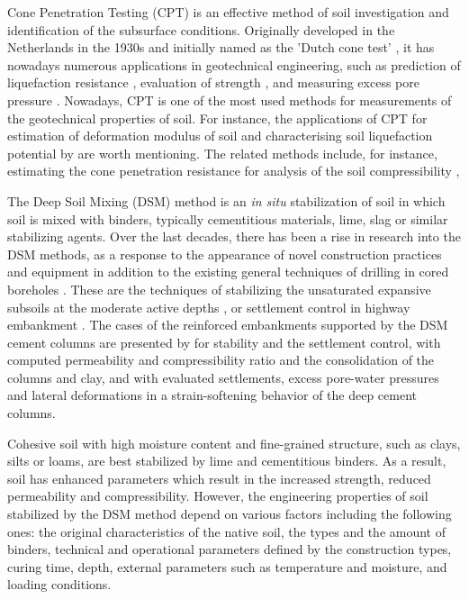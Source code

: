 \documentclass[final,3p,times,onecolumn,authoryear]{elsarticle}
\begin{document}
Cone Penetration Testing (CPT) is an effective method of soil investigation and identification of the subsurface conditions. Originally developed in the Netherlands in the 1930s and initially named as the 'Dutch cone test' \citep{brouwer2007situ,mccallum_2014}, it has nowadays numerous applications in geotechnical engineering, such as prediction of liquefaction resistance \citep{Olsen,Fitzgerald,Saye}, evaluation of strength \citep{Priceetal2016,Jamiolkowski}, and measuring excess pore pressure \citep{SullyCampanella,Elsworthetal2006}. Nowadays, CPT is one of the most used methods for measurements of the geotechnical properties of soil. For instance, the applications of CPT for estimation of deformation modulus of soil \citep{SHAHIEN2013633,BENZNAVARRETE2022289} and characterising soil liquefaction potential by \cite{GUAN20221221} are worth mentioning. The related methods include, for instance, estimating the cone penetration resistance for analysis of the soil compressibility \citep{Bishtetal2021}, 

The Deep Soil Mixing (DSM) method is an \emph{in situ} stabilization of soil in which soil is mixed with binders, typically cementitious materials, lime, slag or similar stabilizing agents. Over the last decades, there has been a rise in research into the DSM methods, as a response to the appearance of novel construction practices and equipment in addition to the existing general techniques of drilling in cored boreholes \citep{Hepton}. These are the techniques of stabilizing the unsaturated expansive subsoils at the moderate active depths \citep{MadhyannapuPuppala,Madhyannapu}, or settlement control in highway embankment \citep{Archeewa}. The cases of the reinforced embankments supported by the DSM cement columns are presented by \cite{Lambrechts} for stability and the settlement control, \cite{Bergado}
with computed permeability and compressibility ratio and the consolidation of the columns and clay, and \cite{Yapageetal2014} with evaluated settlements, excess pore-water pressures and lateral deformations in a strain-softening behavior of the deep cement columns.

Cohesive soil with high moisture content and fine-grained structure, such as clays, silts or loams, are best stabilized by lime and cementitious binders. As a result, soil has enhanced parameters which result in the increased strength, reduced permeability and compressibility. However, the engineering properties of soil stabilized by the DSM method depend on various factors including the following ones: the original characteristics of the native soil, the types and the amount of binders, technical and operational parameters defined by the construction types, curing time, depth, external parameters such as temperature and moisture, and loading conditions.
\end{document}
